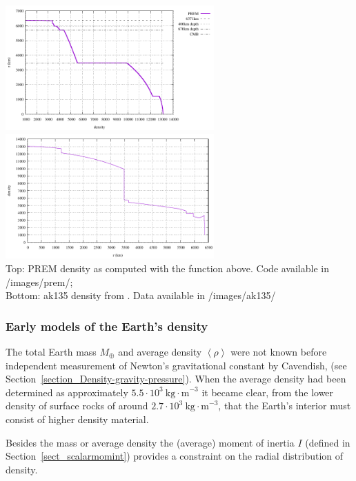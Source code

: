 \begin{center}
\includegraphics[width=8cm]{images/prem/rho.pdf}
\includegraphics[width=8cm]{images/ak135/rho.pdf}\\
{\captionfont Top: PREM density as computed with the function above. 
Code available in /images/prem/; \\
Bottom: ak135 density from \cite{keeb95}.
Data available in /images/ak135/ } 
\end{center}



\subsubsection{Early models of the Earth's density}

The total Earth mass $M_{\oplus}$ and average density $\left <\rho \right >$
were not known 
before independent measurement of Newton's gravitational 
constant by Cavendish, 
(see Section~\ref{section_Density-gravity-pressure}).
When the average density had been determined as approximately 
$5.5 \cdot 10^3~\mathrm{kg\cdot m}^{-3}$ it became clear, 
from the lower density of surface rocks of around 
$2.7 \cdot 10^3~\mathrm{kg\cdot m}^{-3}$,
that the Earth's interior must consist of higher density material.

Besides the mass or average density the (average) 
moment of inertia $I$ (defined in Section~\ref{sect_scalarmomint}) 
provides a constraint on the radial distribution of density.
     

